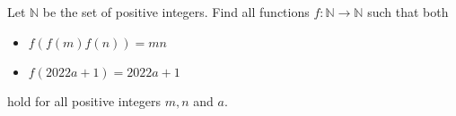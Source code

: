 Let $\mathbb{N}$ be the set of positive integers.
Find all functions $f\colon \mathbb{N} \to \mathbb{N}$ such that both
\begin{itemize}
    \item $f(f(m)f(n)) = mn$
    \item $f(2022a+1) = 2022a+1$
\end{itemize}
hold for all positive integers $m,n$ and $a$.
